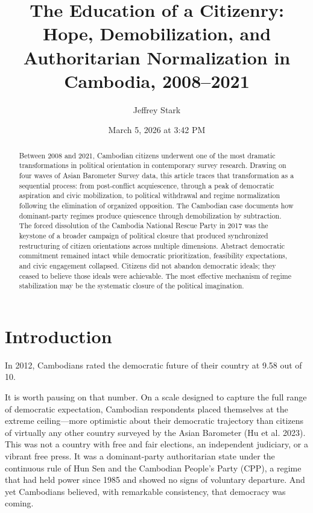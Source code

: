 \documentclass[
  12pt,
  letterpaper]{article}
\title{The Education of a Citizenry: Hope, Demobilization, and
Authoritarian Normalization in Cambodia, 2008--2021}
\author{Jeffrey Stark}
\date{March 5, 2026 at 3:42 PM}
\begin{document}
\maketitle
\begin{abstract}
Between 2008 and 2021, Cambodian citizens underwent one of the most
dramatic transformations in political orientation in contemporary survey
research. Drawing on four waves of Asian Barometer Survey data, this
article traces that transformation as a sequential process: from
post-conflict acquiescence, through a peak of democratic aspiration and
civic mobilization, to political withdrawal and regime normalization
following the elimination of organized opposition. The Cambodian case
documents how dominant-party regimes produce quiescence through
demobilization by subtraction. The forced dissolution of the Cambodia
National Rescue Party in 2017 was the keystone of a broader campaign of
political closure that produced synchronized restructuring of citizen
orientations across multiple dimensions. Abstract democratic commitment
remained intact while democratic prioritization, feasibility
expectations, and civic engagement collapsed. Citizens did not abandon
democratic ideals; they ceased to believe those ideals were achievable.
The most effective mechanism of regime stabilization may be the
systematic closure of the political imagination.
\end{abstract}


\section{Introduction}\label{introduction}

In 2012, Cambodians rated the democratic future of their country at 9.58
out of 10.

It is worth pausing on that number. On a scale designed to capture the
full range of democratic expectation, Cambodian respondents placed
themselves at the extreme ceiling---more optimistic about their
democratic trajectory than citizens of virtually any other country
surveyed by the Asian Barometer (Hu et al. 2023). This was not a country
with free and fair elections, an independent judiciary, or a vibrant
free press. It was a dominant-party authoritarian state under the
continuous rule of Hun Sen and the Cambodian People's Party (CPP), a
regime that had held power since 1985 and showed no signs of voluntary
departure. And yet Cambodians believed, with remarkable consistency,
that democracy was coming.
\end{document}
